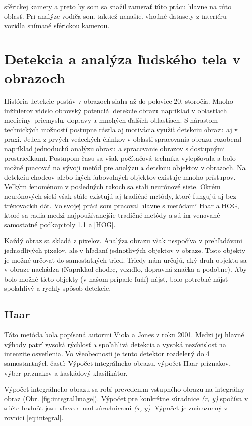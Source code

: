 \documentclass[slovak,master,dept460,male,cpp,cpdeclaration]{diploma}
\begin{document}
sférickej kamery a preto by som sa snažil zamerať túto prácu hlavne na túto oblasť. Pri analýze vodiča som taktiež nenašiel vhodné datasety z interiéru vozidla snímané sférickou kamerou.




\newpage
\section{Detekcia a analýza ľudského tela v obrazoch}
\label{sec:human body decection}

História detekcie postáv v obrazoch siaha až do polovice 20. storočia.  Mnoho inžinierov videlo obrovský potenciál detekcie obrazu napríklad v oblastiach medicíny, priemyslu, dopravy a mnohých ďalších oblastiach. S nárastom technických možností postupne rástla aj motivácia využiť detekciu obrazu aj v praxi. Jeden z prvých vedeckých článkov v oblasti spracovania obrazu \cite{rosenfeld1969} rozoberal napríklad jednoduchú analýzu  obrazu a spracovanie obrazov s dostupnými prostriedkami.  Postupom času sa však počítačová technika vylepšovala a bolo možné pracovať na vývoji metód pre analýzu  a detekciu objektov v obrazoch. Na detekciu chodcov alebo iných ľubovolných objektov existuje mnoho prístupov. Veľkým fenoménom v posledných rokoch sa stali neurónové siete. Okrém neurónových sietí však stále existujú aj tradičné metódy, ktoré fungujú aj bez trénovacích dát. Vo svojej práci som pracoval hlavne s metódami Haar a HOG, ktoré sa radia medzi najpoužívanejšie tradičné metódy a sú im venované samostatné podkapitoly \ref{Haar} a \ref{HOG}.\par
Každý obraz sa skladá z pixelov. Analýza obrazu však nespočíva v prehľadávani jednodlivých pixelov, ale v hľadaní jednotlivých objektov v obraze. Tieto objekty je možné  určovať do  samostatných tried. Triedy nám určujú, aký druh objektu sa v obraze nachádza (Napríklad chodec, vozidlo, dopravná značka a podobne). Aby bolo možné tieto objekty (v našom prípade ľudí) nájsť, bolo potrebné nájsť spoľahlivý a rýchly spôsob detekcie. 


\subsection{Haar}
\label{Haar}
Táto metóda bola popísaná autormi Viola a Jones\cite{viola2001rapid} v roku 2001. Medzi jej hlavné výhody patrí vysoká rýchlosť  a spoľahlivá detekcia a vysoká nezávislosť na intenzite osvetlenia. Vo všeobecnosti je tento detektor rozdelený do 4 samostantných častí: Výpočet integrálneho obrazu,  výpočet Haar príznakov, výber príznakov a kaskádový klasifikátor.\par Výpočet integrálneho obrazu sa robí prevedením vstupného obrazu na integrálny obraz (Obr. \ref{fig:integralImage}). Výpočet pre konkrétne súradnice \textit{(x, y)} spočíva v súčte hodnôt jasu vľavo a nad súradnicami  \textit{(x, y)}. Výpočet je znároznený v rovnici \ref{eq:integral}.
\end{document}
